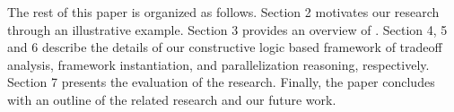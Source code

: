 \documentclass[10pt,conference]{IEEEtran}
\begin{document}
\sloppy

The rest of this paper is organized as follows. Section 2 motivates our research through an illustrative example. Section 3 provides an overview of \@approach. Section 4, 5 and 6 describe the details of our constructive logic based framework of tradeoff analysis, framework instantiation, and parallelization reasoning, respectively. Section 7 presents the evaluation of the research. Finally, the paper concludes with an outline of the related research and our future work.

\end{document}
